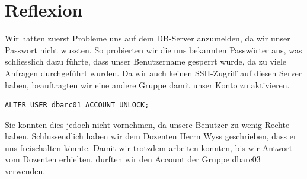 \documentclass[10pt]{article}
\begin{document}
\section{Reflexion}
Wir hatten zuerst Probleme uns auf dem DB-Server anzumelden, da wir unser Passwort nicht wussten. So 
probierten wir die uns bekannten Passwörter aus, was schliesslich dazu führte, dass unser Benutzername
gesperrt wurde, da zu viele Anfragen durchgeführt wurden. Da wir auch keinen SSH-Zugriff auf diesen 
Server haben, beauftragten wir eine andere Gruppe damit unser Konto zu aktivieren.
\begin{lstlisting}[style=sql]
ALTER USER dbarc01 ACCOUNT UNLOCK;
\end{lstlisting}
Sie konnten dies jedoch nicht vornehmen, da unsere Benutzer zu wenig Rechte haben. Schlussendlich 
haben wir dem Dozenten Herrn Wyss geschrieben, dass er uns freischalten könnte. Damit wir trotzdem 
arbeiten konnten, bis wir Antwort vom Dozenten erhielten, durften wir den Account der Gruppe dbarc03 
verwenden.

\end{document}
